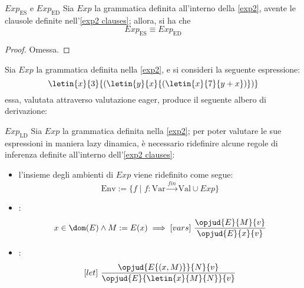 \documentclass[a4paper, 12pt]{report}
\begin{document}
    \begin{framedlem}{$Exp_\mathrm{ES}$ e $Exp_\mathrm{ED}$}
        Sia $Exp$ la grammatica definita all'interno della \cref{exp2}, avente le clausole definite nell'\cref{exp2 clauses}; allora, si ha che $$Exp_\mathrm{ES} \equiv Exp_\mathrm{ED}$$
    \end{framedlem}

    \begin{proof}
        Omessa.
    \end{proof}

    \begin{example}
        \label{eager2}
        Sia $Exp$ la grammatica definita nella \cref{exp2}, e si consideri la seguente espressione: $$\letin{x}{3}{(\letin{y}{x}{(\letin{x}{7}{y + x})})}$$ essa, valutata attraverso valutazione eager, produce il seguente albero di derivazione: 
    \end{example}

    \begin{framedprop}{$Exp_\mathrm{LD}$}
        Sia $Exp$ la grammatica definita nella \cref{exp2}; per poter valutare le sue espressioni in maniera lazy dinamica, è necessario ridefinire alcune regole di inferenza definite all'interno dell'\cref{exp2 clauses}:

        \begin{itemize}
            \item l'insieme degli ambienti di $Exp$ viene ridefinito come segue: $$\mathrm{Env} := \{f \mid f :\mathrm{Var} \xrightarrow{fin} \mathrm{Val} \cup Exp\}$$
            \item {}: $$x \in \dom(E) \land M := E(x) \implies [vars] \ \dfrac{\opjud{E}{M}{v}}{\opjud{E}{x}{v}}$$
            \item {}: $$[let] \ \dfrac{\opjud{E\{(x, M)\}}{N}{v}}{\opjud{E}{\letin{x}{M}{N}}{v}}$$
        \end{itemize}
    \end{framedprop}
\end{document}

